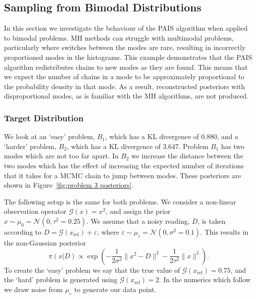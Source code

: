 \documentclass[final]{siamltex}
\newcommand{\G}{\mathcal{G}}
\newcommand{\N}{\mathcal{N}}
\begin{document}
\subsection{Sampling from Bimodal Distributions}\label{sec:bimodal}

In this section we investigate the behaviour of the PAIS algorithm
when applied to bimodal problems. MH methods can
struggle with multimodal problems, particularly where switches between
the modes are rare, resulting in incorrectly proportioned modes in the
histograms. This example demonstrates that the PAIS algorithm redistributes 
chains to new modes as they are found. This means that we expect the number of chains in a mode to be
approximately proportional to the probability density in that mode. As a result, reconstructed posteriors with disproportional modes, as is familiar with the MH algorithms, are not produced.

\subsubsection{Target Distribution} \label{sec:tar}

We look at an `easy' problem, $B_1$, which has a KL divergence of
0.880, and a `harder' problem, $B_2$, which has a KL divergence of
3.647. Problem $B_1$ has two modes which are not too far apart. In
$B_2$ we increase the distance between the two modes which has the
effect of increasing the expected number of iterations that it takes
for a MCMC chain to jump between modes. These posteriors are shown in Figure~\ref{fig:problem 3 posteriors}.

The following setup is the same for both problems. We consider a
non-linear observation operator $\G(x) = x^2$, and assign the prior
$x \sim \mu_0 = \N(0, \tau^2=0.25)$. We assume that a noisy reading,
$D$, is taken according to $D = \G(x_\text{ref}) + \varepsilon$, where
$\varepsilon \sim \mu_\varepsilon = \N(0, \sigma^2 = 0.1)$. This results
in the non-Gaussian posterior
\[
	\pi(x|D) \propto \exp\left(-\frac{1}{2\sigma^2}\|x^2 - D\|^2 - \frac{1}{2\tau^2}\|x\|^2\right).
\]
To create the `easy' problem we say that the true value of
$\G(x_\text{ref}) = 0.75$, and the `hard' problem is generated using
$\G(x_\text{ref}) = 2$. In the numerics which follow we draw noise from
$\mu_\varepsilon$ to generate our data point.
\end{document}
